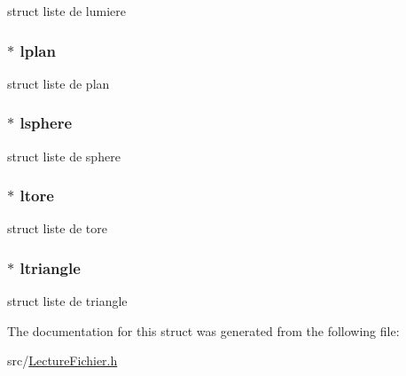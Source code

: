 \label{structobjet_a6c4654d9a5ac31412ffe066d9113018d}
struct liste de lumiere \hypertarget{structobjet_a6c0864a0bbb65be0c48b341061498fd9}{
\subsubsection[{lplan}]{$\ast$ {\bf lplan}}}
\label{structobjet_a6c0864a0bbb65be0c48b341061498fd9}
struct liste de plan \hypertarget{structobjet_ad6fc54edaae24f34f8093b277a3b2d04}{
\subsubsection[{lsphere}]{$\ast$ {\bf lsphere}}}
\label{structobjet_ad6fc54edaae24f34f8093b277a3b2d04}
struct liste de sphere \hypertarget{structobjet_a47505e910fde32e049a2e94ad84b48c0}{
\subsubsection[{ltore}]{$\ast$ {\bf ltore}}}
\label{structobjet_a47505e910fde32e049a2e94ad84b48c0}
struct liste de tore \hypertarget{structobjet_aa64fa005027990999edeea5037673d45}{
\subsubsection[{ltriangle}]{$\ast$ {\bf ltriangle}}}
\label{structobjet_aa64fa005027990999edeea5037673d45}
struct liste de triangle 

The documentation for this struct was generated from the following file:\begin{DoxyCompactItemize}
\item 
src/\hyperlink{_lecture_fichier_8h}{LectureFichier.h}\end{DoxyCompactItemize}
